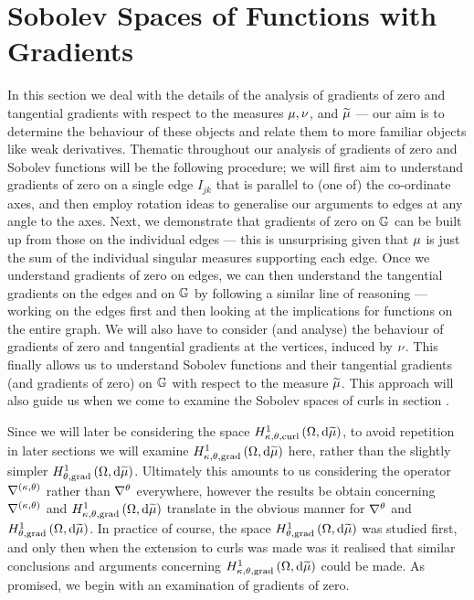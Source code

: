 \section{Sobolev Spaces of Functions with Gradients} \label{sec:3DGradSobSpaces}
In this section we deal with the details of the analysis of gradients of zero and tangential gradients with respect to the measures $\mu, \nu$, and $\widetilde{\mu}$ --- our aim is to determine the behaviour of these objects and relate them to more familiar objects like weak derivatives.
Thematic throughout our analysis of gradients of zero and Sobolev functions will be the following procedure; we will first aim to understand gradients of zero on a single edge $I_{jk}$ that is parallel to (one of) the co-ordinate axes, and then employ rotation ideas to generalise our arguments to edges at any angle to the axes.
Next, we demonstrate that gradients of zero on $\mathbb{G}$ can be built up from those on the individual edges --- this is unsurprising given that $\mu$ is just the sum of the individual singular measures supporting each edge.
Once we understand gradients of zero on edges, we can then understand the tangential gradients on the edges and on $\mathbb{G}$ by following a similar line of reasoning --- working on the edges first and then looking at the implications for functions on the entire graph.
We will also have to consider (and analyse) the behaviour of gradients of zero and tangential gradients at the vertices, induced by $\nu$.
This finally allows us to understand Sobolev functions and their tangential gradients (and gradients of zero) on $\mathbb{G}$ with respect to the measure $\widetilde{\mu}$.
This approach will also guide us when we come to examine the Sobolev spaces of curls in section .

Since we will later be considering the space $H^1_{\kappa,\theta,\mathrm{curl}}\left( \Omega, \mathrm{d}\widetilde{\mu} \right)$, to avoid repetition in later sections we will examine $H^1_{\kappa,\theta,\mathrm{grad}}\left( \Omega, \mathrm{d}\widetilde{\mu} \right)$ here, rather than the slightly simpler $H^1_{\theta, \mathrm{grad}}\left( \Omega, \mathrm{d}\widetilde{\mu} \right)$.
Ultimately this amounts to us considering the operator $\nabla^{\left( \kappa, \theta \right)}$ rather than $\nabla^{\theta}$ everywhere, however the results be obtain concerning $\nabla^{\left( \kappa, \theta \right)}$ and $H^1_{\kappa,\theta,\mathrm{grad}}\left( \Omega, \mathrm{d}\widetilde{\mu} \right)$ translate in the obvious manner for $\nabla^{\theta}$ and $H^1_{\theta, \mathrm{grad}}\left( \Omega, \mathrm{d}\widetilde{\mu} \right)$.
In practice of course, the space $H^1_{\theta, \mathrm{grad}}\left( \Omega, \mathrm{d}\widetilde{\mu} \right)$ was studied first, and only then when the extension to curls was made was it realised that similar conclusions and arguments concerning $H^1_{\kappa,\theta,\mathrm{grad}}\left( \Omega, \mathrm{d}\widetilde{\mu} \right)$ could be made.
As promised, we begin with an examination of gradients of zero.

